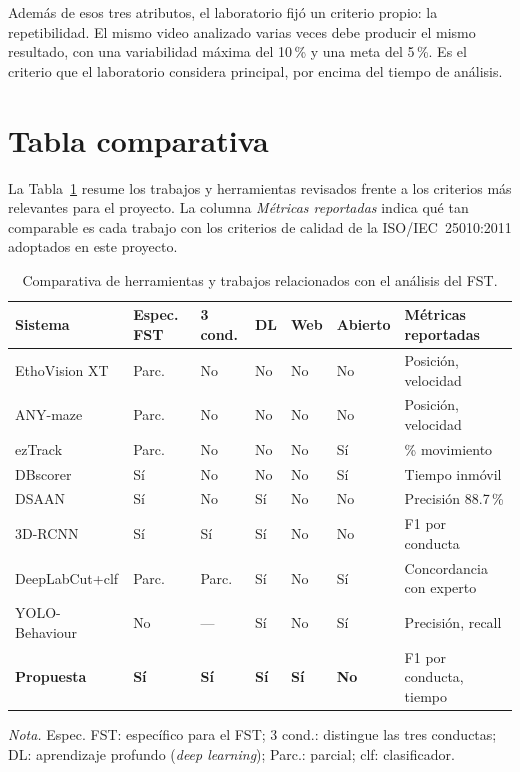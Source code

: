 Además de esos tres atributos, el laboratorio fijó un criterio propio: la repetibilidad.
El mismo video analizado varias veces debe producir el mismo resultado, con una
variabilidad máxima del 10\,\% y una meta del 5\,\%. Es el criterio que el laboratorio considera
principal, por encima del tiempo de análisis.

\section{Tabla comparativa}

La Tabla~\ref{tab:comparativa_herramientas} resume los trabajos y herramientas
revisados frente a los criterios más relevantes para el proyecto. La columna
\textit{Métricas reportadas} indica qué tan comparable es cada trabajo con los
criterios de calidad de la ISO/IEC~25010:2011 \cite{iso25010} adoptados en este
proyecto.

\begin{table}[H]
\centering
\caption{Comparativa de herramientas y trabajos relacionados con el análisis del FST.}
\label{tab:comparativa_herramientas}
{\setlength{\tabcolsep}{4pt}\footnotesize
\begin{tabular}{p{2.6cm}p{1.2cm}p{1.1cm}p{0.7cm}p{0.7cm}p{1.1cm}p{4.2cm}}
\hline
\textbf{Sistema} & \textbf{Espec. FST} & \textbf{3 cond.} & \textbf{DL} & \textbf{Web} & \textbf{Abierto} & \textbf{Métricas reportadas} \\
\hline
EthoVision XT  & Parc. & No    & No  & No  & No  & Posición, velocidad \\
ANY-maze       & Parc. & No    & No  & No  & No  & Posición, velocidad \\
ezTrack        & Parc. & No    & No  & No  & Sí  & \% movimiento \\
DBscorer       & Sí    & No    & No  & No  & Sí  & Tiempo inmóvil \\
DSAAN          & Sí    & No    & Sí  & No  & No  & Precisión 88.7\,\% \\
3D-RCNN        & Sí    & Sí    & Sí  & No  & No  & F1 por conducta \\
DeepLabCut+clf & Parc. & Parc. & Sí  & No  & Sí  & Concordancia con experto \\
YOLO-Behaviour & No    & ---   & Sí  & No  & Sí  & Precisión, recall \\
\hline
\textbf{Propuesta} & \textbf{Sí} & \textbf{Sí} & \textbf{Sí} & \textbf{Sí} & \textbf{No} & F1 por conducta, tiempo \\
\hline
\end{tabular}}

\vspace{2pt}
{\footnotesize \textit{Nota.} Espec. FST: específico para el FST; 3 cond.: distingue las tres
conductas; DL: aprendizaje profundo (\textit{deep learning}); Parc.: parcial; clf: clasificador.}
\end{table}

